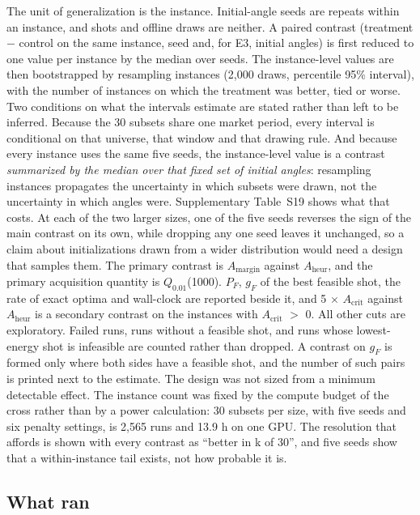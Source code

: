 \documentclass[journal]{IEEEtran}
\begin{document}
The unit of generalization is the instance. Initial-angle seeds are repeats within an instance, and shots and offline draws are neither. A paired contrast (treatment $-$ control on the same instance, seed and, for E3, initial angles) is first reduced to one value per instance by the median over seeds. The instance-level values are then bootstrapped by resampling instances (2,000 draws, percentile 95\% interval), with the number of instances on which the treatment was better, tied or worse. Two conditions on what the intervals estimate are stated rather than left to be inferred. Because the 30 subsets share one market period, every interval is conditional on that universe, that window and that drawing rule. And because every instance uses the same five seeds, the instance-level value is a contrast \textit{summarized by the median over that fixed set of initial angles}: resampling instances propagates the uncertainty in which subsets were drawn, not the uncertainty in which angles were. Supplementary Table~S19 shows what that costs. At each of the two larger sizes, one of the five seeds reverses the sign of the main contrast on its own, while dropping any one seed leaves it unchanged, so a claim about initializations drawn from a wider distribution would need a design that samples them. The primary contrast is $A_{\mathrm{margin}}$ against $A_{\mathrm{heur}}$, and the primary acquisition quantity is $Q_{0.01}$(1000). $P_{F}$, $g_{F}$ of the best feasible shot, the rate of exact optima and wall-clock are reported beside it, and 5 $\times$ $A_{\mathrm{crit}}$ against $A_{\mathrm{heur}}$ is a secondary contrast on the instances with $A_{\mathrm{crit}}$ $>$ 0. All other cuts are exploratory. Failed runs, runs without a feasible shot, and runs whose lowest-energy shot is infeasible are counted rather than dropped. A contrast on $g_{F}$ is formed only where both sides have a feasible shot, and the number of such pairs is printed next to the estimate. The design was not sized from a minimum detectable effect. The instance count was fixed by the compute budget of the cross rather than by a power calculation: 30 subsets per size, with five seeds and six penalty settings, is 2,565 runs and 13.9 h on one GPU. The resolution that affords is shown with every contrast as ``better in k of 30'', and five seeds show that a within-instance tail exists, not how probable it is.


\subsection{What ran}
\end{document}
